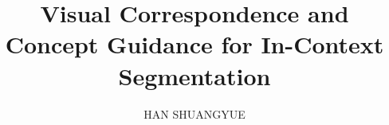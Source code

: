 \documentclass[10pt,twocolumn,letterpaper]{article}
\title{Visual Correspondence and Concept Guidance for In-Context Segmentation}
\author{HAN SHUANGYUE}
\date{}
\begin{document}
\twocolumn[\maketitle]

\end{document}
